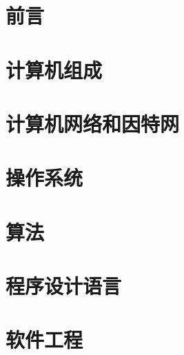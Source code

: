 \documentclass[a4pape]{book}
\begin{document}
\chapter{前言}

\chapter{计算机组成}

\chapter{计算机网络和因特网}

\chapter{操作系统}

\chapter{算法}

\chapter{程序设计语言}

\chapter{软件工程}

\end{document}
